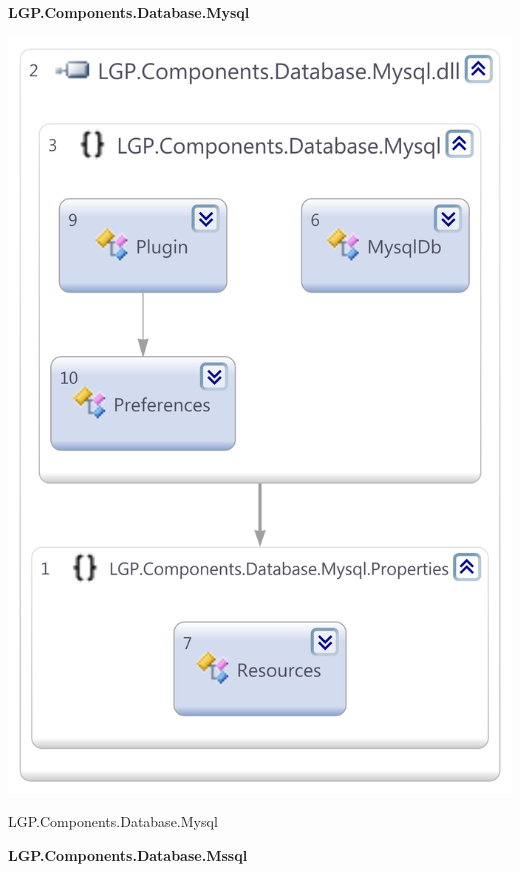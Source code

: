 		
	\begin{multicols}{2}
	
		\large{\bfseries{LGP.Components.Database.Mysql}}
		\vspace{5mm}
		
			\begin{figurehere}
				\centering
				\includegraphics[scale=0.35]{pages/appendix3/figures/dllscreens/mysql.png}
				\caption{LGP.Components.Database.Mysql}
			\end{figurehere}
					
		
		\large{\bfseries{LGP.Components.Database.Mssql}}
		\vspace{5mm}
		

\end{multicols}
